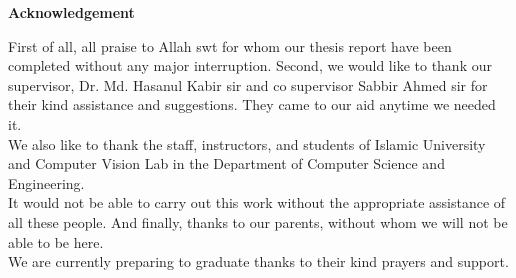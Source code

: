 \begin{center}
\Large \textbf{Acknowledgement}
\end{center}
\normalsize
First of all, all praise to Allah swt for whom our thesis report have been completed without any major interruption. Second, we would like to thank our supervisor, Dr. Md. Hasanul Kabir sir and co supervisor Sabbir Ahmed sir for their kind assistance and suggestions. They came to our aid anytime we needed it.\\
We also like to thank the staff, instructors, and students of Islamic University and Computer Vision Lab in the Department of Computer Science and Engineering.\\
It would not be able to carry out this work without the appropriate assistance of all these people. And finally, thanks to our parents, without whom we will not be able to be here.\\
We are currently preparing to graduate thanks to their kind prayers and support. 